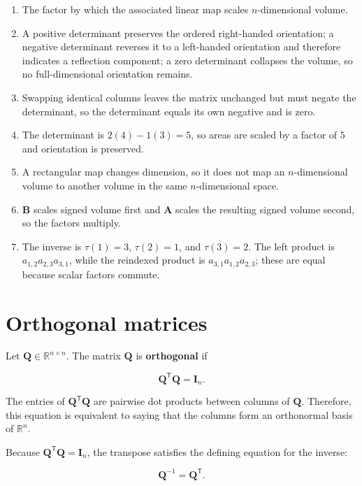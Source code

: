 \documentclass[
  australian,
  12pt,
  letterpaper,
  DIV=11,
  numbers=noendperiod,
  twoside]{scrreprt}
\providecommand{\tightlist}{%
  \setlength{\itemsep}{0pt}\setlength{\parskip}{0pt}}
\begin{document}
\begin{enumerate}
\def\labelenumi{\arabic{enumi}.}
\tightlist
\item
  The factor by which the associated linear map scales \(n\)-dimensional
  volume.
\item
  A positive determinant preserves the ordered right-handed orientation;
  a negative determinant reverses it to a left-handed orientation and
  therefore indicates a reflection component; a zero determinant
  collapses the volume, so no full-dimensional orientation remains.
\item
  Swapping identical columns leaves the matrix unchanged but must negate
  the determinant, so the determinant equals its own negative and is
  zero.
\item
  The determinant is \(2(4)-1(3)=5\), so areas are scaled by a factor of
  \(5\) and orientation is preserved.
\item
  A rectangular map changes dimension, so it does not map an
  \(n\)-dimensional volume to another volume in the same
  \(n\)-dimensional space.
\item
  \(\mathbf B\) scales signed volume first and \(\mathbf A\) scales the
  resulting signed volume second, so the factors multiply.
\item
  The inverse is \(\tau(1)=3\), \(\tau(2)=1\), and \(\tau(3)=2\). The
  left product is \(a_{1,2}a_{2,3}a_{3,1}\), while the reindexed product
  is \(a_{3,1}a_{1,2}a_{2,3}\); these are equal because scalar factors
  commute.
\end{enumerate}

\section{Orthogonal matrices}\label{orthogonal-matrices}

Let \(\mathbf Q\in\mathbb R^{n\times n}\). The matrix \(\mathbf Q\) is
\textbf{orthogonal} if

\[
\mathbf Q^{\mathsf T}\mathbf Q=\mathbf I_n.
\]

The entries of \(\mathbf Q^{\mathsf T}\mathbf Q\) are pairwise dot
products between columns of \(\mathbf Q\). Therefore, this equation is
equivalent to saying that the columns form an orthonormal basis of
\(\mathbb R^n\).

Because \(\mathbf Q^{\mathsf T}\mathbf Q=\mathbf I_n\), the transpose
satisfies the defining equation for the inverse:

\[
\boxed{\mathbf Q^{-1}=\mathbf Q^{\mathsf T}}.
\]
\end{document}
